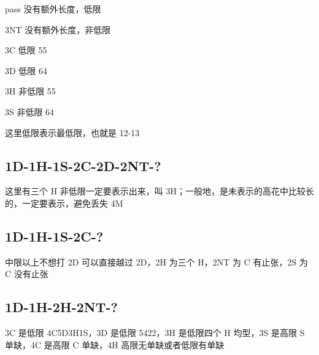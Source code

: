 \documentclass[UTF8]{article}
\begin{document}
pass 没有额外长度，低限

3NT 没有额外长度，非低限

3C 低限 55

3D 低限 64

3H 非低限 55

3S 非低限 64

这里低限表示最低限，也就是 12-13

\subsection*{1D-1H-1S-2C-2D-2NT-?}

这里有三个 H 非低限一定要表示出来，叫 3H；一般地，是未表示的高花中比较长的，一定要表示，避免丢失 4M

\subsection*{1D-1H-1S-2C-?}

中限以上不想打 2D 可以直接越过 2D，2H 为三个 H，2NT 为 C 有止张，2S 为 C 没有止张

\subsection*{1D-1H-2H-2NT-?}

3C 是低限 4C5D3H1S，3D 是低限 5422，3H 是低限四个 H 均型，3S 是高限 S 单缺，4C 是高限 C 单缺，4H 高限无单缺或者低限有单缺
\end{document}
